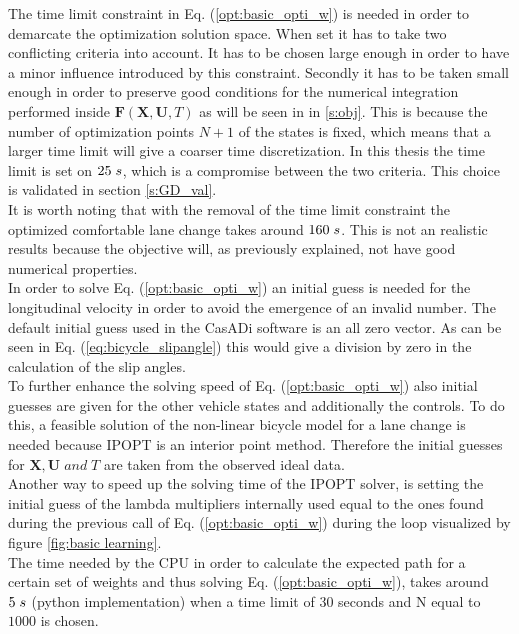 The time limit constraint in Eq. (\ref{opt:basic_opti_w}) is needed in order to demarcate the optimization solution space. When set it has to take two conflicting criteria into account. It has to be chosen large enough in order to have a minor influence introduced by this constraint. Secondly it has to be taken small enough in order to preserve good conditions for the numerical integration performed inside $\bm{F}(\bm{X},\bm{U}, T)$ as will be seen in in \ref{s:obj}. This is because the number of optimization points $N+1$ of the states is fixed, which means that a larger time limit will give a coarser time discretization. In this thesis the time limit is set on $25\hspace{1mm}s$, which is a compromise between the two criteria. This choice is validated in section \ref{s:GD_val}.\\It is worth noting that with the removal of the time limit constraint the optimized comfortable lane change takes around $160 \hspace{1mm}s$. This is not an realistic results because the objective will, as previously explained, not have good numerical properties.\\ 

In order to solve Eq. (\ref{opt:basic_opti_w}) an initial guess is needed for the longitudinal velocity in order to avoid the emergence of an invalid number. The default initial guess used in the CasADi software is an all zero vector. As can be seen in Eq. (\ref{eq:bicycle_slipangle}) this would give a division by zero in the calculation of the slip angles. \\
To further enhance the solving speed of Eq. (\ref{opt:basic_opti_w}) also initial guesses are given for the other vehicle states and additionally the controls. To do this, a feasible solution of the non-linear bicycle model for a lane change is needed because IPOPT is an interior point method. Therefore the initial guesses for $\bm{X}, \bm{U} \;and\; T$ are taken from the observed ideal data. \\

Another way to speed up the solving time of the IPOPT solver, is setting the initial guess of the lambda multipliers internally used equal to the ones found during the previous call of Eq. (\ref{opt:basic_opti_w}) during the loop visualized by figure \ref{fig:basic learning}. \\The time needed by the CPU in order to calculate the expected path for a certain set of weights and thus solving Eq. (\ref{opt:basic_opti_w}), takes around $5\hspace{1mm}s$ (python implementation) when a time limit of $30$ seconds and N equal to $1000$ is chosen.\\

